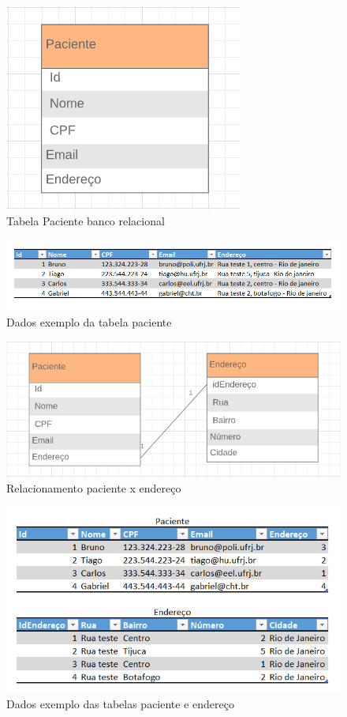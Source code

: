 \begin{figure}[h!]
	\begin{center}
		\includegraphics[width=0.2\linewidth]{images/bd_relacional_antes.png}
		\caption{Tabela Paciente banco relacional}
		\label{fig:bd_relacional_antes}
	\end{center}
\end{figure}

\begin{figure}[h!]
	\begin{center}
		\includegraphics[width=1\linewidth]{images/bd_relacional_dados.png}
		\caption{Dados exemplo da tabela paciente}
		\label{fig:bd_relacional_dados}
	\end{center}
\end{figure}

\begin{figure}[h!]
	\begin{center}
		\includegraphics[width=0.3\linewidth]{images/bd_relacional_intermediario.png}
		\caption{Relacionamento paciente x endereço}
		\label{fig:bd_relacional_intermediarios}
	\end{center}
\end{figure}

\begin{figure}[h!]
	\begin{center}
		\includegraphics[width=0.8\linewidth]{images/bd_relacional_dados_depois.png}
		\caption{Dados exemplo das tabelas paciente e endereço}
		\label{fig:bd_relacional_dados_depois}
	\end{center}
\end{figure}

